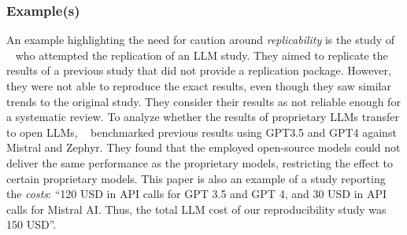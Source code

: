 \subsubsection{Example(s)}

An example highlighting the need for caution around \emph{replicability} is the study of \citeauthor{DBLP:conf/sigir-ap/StaudingerKPLH24}~\cite{DBLP:conf/sigir-ap/StaudingerKPLH24} who attempted the replication of an LLM study. They aimed to replicate the results of a previous study that did not provide a replication package. However, they were not able to reproduce the exact results, even though they saw similar trends to the original study. They consider their results as not reliable enough for a systematic review.
To analyze whether the results of proprietary LLMs transfer to open LLMs, \citeauthor{DBLP:conf/sigir-ap/StaudingerKPLH24}~\cite{DBLP:conf/sigir-ap/StaudingerKPLH24} benchmarked previous results using GPT3.5 and GPT4 against Mistral and Zephyr. They found that the employed open-source models could not deliver the same performance as the proprietary models, restricting the effect to certain proprietary models.
This paper is also an example of a study reporting the \emph{costs}: \enquote{120 USD in API calls for GPT 3.5 and GPT 4, and 30 USD in API calls for Mistral AI. Thus, the total LLM cost of our reproducibility study was 150 USD}.

